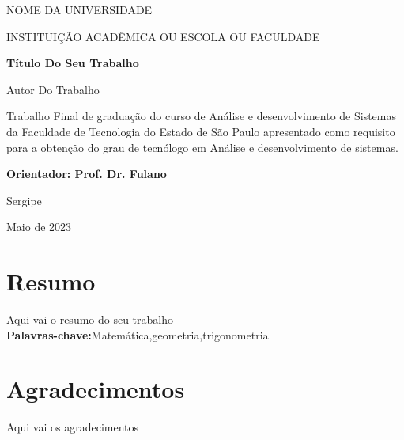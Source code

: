 \documentclass[a4paper,12pt, oneside]{book}
\begin{document}
\begin{titlepage}
	\addtolength{\topmargin}{1.5cm} %
	\setlength{\baselineskip}{1.4\baselineskip} %
	
	\begin{center}
		{\large{NOME DA UNIVERSIDADE}}
		
		{\large{INSTITUIÇÃO ACADÊMICA OU ESCOLA OU FACULDADE}}
	\end{center}

	\vspace{2cm}
	
	\begin{center}
		{\Large{\textbf{Título Do Seu Trabalho}}}
	\end{center}		
	
	\vspace{1.5cm}
	
	\begin{center}
		{\Large{Autor Do Trabalho}}
	\end{center}
	
	\vspace{2cm}
	
	\begin{flushright}
		\begin{minipage}[t]{12cm}
			\hrulefill
	
				Trabalho Final de graduação do curso de Análise e desenvolvimento de 	Sistemas da Faculdade de Tecnologia do Estado de São Paulo apresentado como requisito para a obtenção do grau de tecnólogo em Análise e desenvolvimento de sistemas.

			\hrulefill
			
			\vspace{0.2cm}
			
			{\bf Orientador: Prof. Dr. Fulano}
		\end{minipage}
	\end{flushright}
	\setlength{\baselineskip}{0.7\baselineskip}
	\vfill %

	\begin{center}
		Sergipe
		
		Maio de 2023
	\end{center}
	
\end{titlepage}


\chapter*{Resumo}
\noindent
Aqui vai o resumo do seu trabalho\\
{\textbf{Palavras-chave:}Matemática,geometria,trigonometria}

\chapter*{Agradecimentos}
Aqui vai os agradecimentos
\end{document}
